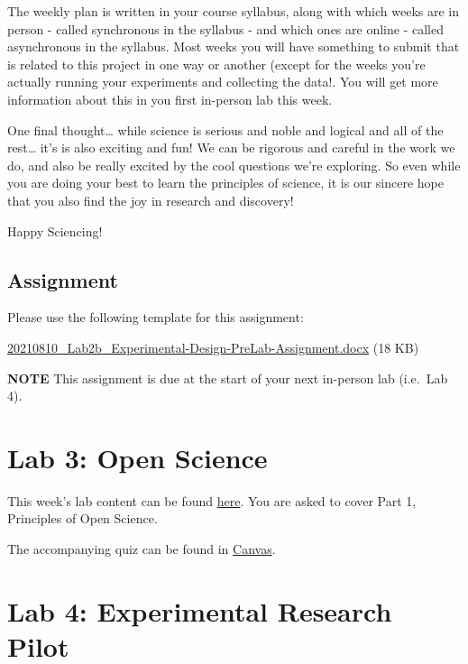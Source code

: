 \documentclass[
]{book}
\begin{document}
The weekly plan is written in your course syllabus, along with which weeks are in person - called synchronous in the syllabus - and which ones are online - called asynchronous in the syllabus. Most weeks you will have something to submit that is related to this project in one way or another (except for the weeks you're actually running your experiments and collecting the data!. You will get more information about this in you first in-person lab this week.

One final thought\ldots{} while science is serious and noble and logical and all of the rest\ldots{} it's is also exciting and fun! We can be rigorous and careful in the work we do, and also be really excited by the cool questions we're exploring. So even while you are doing your best to learn the principles of science, it is our sincere hope that you also find the joy in research and discovery!

Happy Sciencing!

\hypertarget{assignment}{%
\section*{Assignment}\label{assignment}}

Please use the following template for this assignment:

\href{files/20210810_Lab2b_Experimental-Design-PreLab-Assignment-V1.docx}{20210810\_Lab2b\_Experimental-Design-PreLab-Assignment.docx} (18 KB)

\textbf{NOTE} This assignment is due at the start of your next in-person lab (i.e.~Lab 4).

\hypertarget{lab-3-open-science}{%
\chapter*{Lab 3: Open Science}\label{lab-3-open-science}}

This week's lab content can be found \href{https://ubco-biology.github.io/OS-Introduction/}{here}. You are asked to cover Part 1, Principles of Open Science.

The accompanying quiz can be found in \href{https://canvas.ubc.ca}{Canvas}.

\hypertarget{lab-4-experimental-research-pilot}{%
\chapter*{Lab 4: Experimental Research Pilot}\label{lab-4-experimental-research-pilot}}
\end{document}
